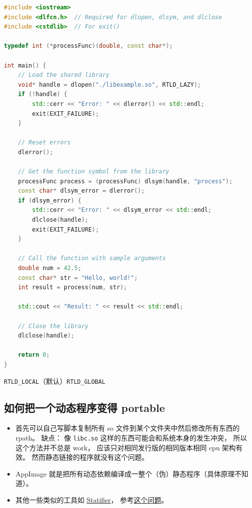 \begin{lstlisting}[language=cpp]
#include <iostream>
#include <dlfcn.h>  // Required for dlopen, dlsym, and dlclose
#include <cstdlib>  // For exit()

typedef int (*processFunc)(double, const char*);

int main() {
    // Load the shared library
    void* handle = dlopen("./libexample.so", RTLD_LAZY);
    if (!handle) {
        std::cerr << "Error: " << dlerror() << std::endl;
        exit(EXIT_FAILURE);
    }

    // Reset errors
    dlerror();

    // Get the function symbol from the library
    processFunc process = (processFunc) dlsym(handle, "process");
    const char* dlsym_error = dlerror();
    if (dlsym_error) {
        std::cerr << "Error: " << dlsym_error << std::endl;
        dlclose(handle);
        exit(EXIT_FAILURE);
    }

    // Call the function with sample arguments
    double num = 42.5;
    const char* str = "Hello, world!";
    int result = process(num, str);
    
    std::cout << "Result: " << result << std::endl;

    // Close the library
    dlclose(handle);

    return 0;
}
\end{lstlisting}

\verb`RTLD_LOCAL`（默认）\verb`RTLD_GLOBAL`

\subsection{如何把一个动态程序变得 portable}
\begin{itemize}
\item 首先可以自己写脚本复制所有 so 文件到某个文件夹中然后修改所有东西的 rpath。 缺点： 像 \verb`libc.so` 这样的东西可能会和系统本身的发生冲突， 所以这个方法并不总是 work， 应该只对相同发行版的相同版本相同 cpu 架构有效。 然而静态链接的程序就没有这个问题。
\item AppImage 就是把所有动态依赖编译成一整个（伪）静态程序（具体原理不知道）。
\item 其他一些类似的工具如 \href{https://statifier.sourceforge.net/}{Statifier}， 参考\href{https://askubuntu.com/questions/537479/is-there-any-open-source-way-to-make-a-static-from-a-dynamic-executable-with-no}{这个问题}。
\end{itemize}
